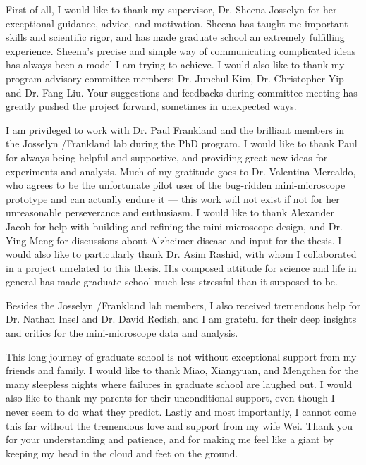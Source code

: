 First of all, I would like to thank my supervisor, Dr. Sheena Josselyn for her exceptional guidance, advice, and motivation. Sheena has taught me important skills and scientific rigor, and has made graduate school an extremely fulfilling experience. Sheena's precise and simple way of communicating complicated ideas has always been a model I am trying to achieve. I would also like to thank my program advisory committee members: Dr. Junchul Kim, Dr. Christopher Yip and Dr. Fang Liu. Your suggestions and feedbacks during committee meeting has greatly pushed the project forward, sometimes in unexpected ways. 

I am privileged to work with Dr. Paul Frankland and the brilliant members in the Josselyn \slash Frankland lab during the PhD program. I would like to thank Paul for always being helpful and supportive, and providing great new ideas for experiments and analysis. Much of my gratitude goes to Dr. Valentina Mercaldo, who agrees to be the unfortunate pilot user of the bug-ridden mini-microscope prototype and can actually endure it --- this work will not exist if not for her unreasonable perseverance and euthusiasm. I would like to thank Alexander Jacob for help with building and refining the mini-microscope design, and Dr. Ying Meng for discussions about Alzheimer disease and input for the thesis. I would also like to particularly thank Dr. Asim Rashid, with whom I collaborated in a project unrelated to this thesis. His composed attitude for science and life in general has made graduate school much less stressful than it supposed to be. 

Besides the Josselyn \slash Frankland lab members, I also received tremendous help for Dr. Nathan Insel and Dr. David Redish, and I am grateful for their deep insights and critics for the mini-microscope data and analysis. 

This long journey of graduate school is not without exceptional support from my friends and family.  I would like to thank Miao, Xiangyuan, and Mengchen for the many sleepless nights where failures in graduate school are laughed out. I would also like to thank my parents for their unconditional support, even though I never seem to do what they predict. Lastly and most importantly, I cannot come this far without the tremendous love and support from my wife Wei. Thank you for your understanding and patience, and for making me feel like a giant by keeping my head in the cloud and feet on the ground. 


